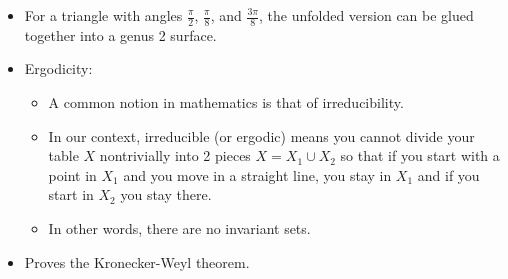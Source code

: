 \documentclass[../apprentice.tex]{subfiles}
\begin{document}
\begin{itemize}
    \item For a triangle with angles $\frac{\pi}{2}$, $\frac{\pi}{8}$, and $\frac{3\pi}{8}$, the unfolded version can be glued together into a genus 2 surface.
    \item Ergodicity:
    \begin{itemize}
        \item A common notion in mathematics is that of irreducibility.
        \item In our context, irreducible (or ergodic) means you cannot divide your table $X$ nontrivially into 2 pieces $X=X_1\cup X_2$ so that if you start with a point in $X_1$ and you move in a straight line, you stay in $X_1$ and if you start in $X_2$ you stay there.
        \item In other words, there are no invariant sets.
    \end{itemize}
    \item Proves the Kronecker-Weyl theorem.
\end{itemize}
\end{document}
